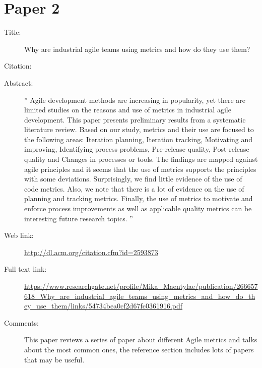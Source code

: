 \documentclass{scrartcl}
\begin{document}
\section*{Paper 2}
\begin{description}
	\item[Title:] Why are industrial agile teams using metrics and how do they use them?
	\item[Citation:] \cite{Kupiainen}
	\item[Abstract:] '' Agile development methods are increasing in popularity, yet there are limited studies on the reasons and use of metrics in industrial agile development. This paper presents preliminary results from a systematic literature review. Based on our study, metrics and their use are focused to the following areas: Iteration planning, Iteration tracking, Motivating and improving, Identifying process problems, Pre-release quality, Post-release quality and Changes in processes or tools. The findings are mapped against agile principles and it seems that the use of metrics supports the principles with some deviations. Surprisingly, we find little evidence of the use of code metrics. Also, we note that there is a lot of evidence on the use of planning and tracking metrics. Finally, the use of metrics to motivate and enforce process improvements as well as applicable quality metrics can be interesting future research topics. ''
	\item[Web link:] \url{http://dl.acm.org/citation.cfm?id=2593873}
	\item[Full text link:] \url{https://www.researchgate.net/profile/Mika_Maentylae/publication/266657618_Why_are_industrial_agile_teams_using_metrics_and_how_do_they_use_them/links/54734bea0cf2d67fc0361916.pdf}
	\item[Comments:] This paper reviews a series of paper about different Agile metrics and talks about the most common ones, the reference section includes lots of papers that may be useful. 
\end{description}
\end{document}

